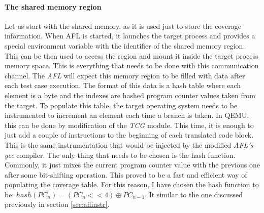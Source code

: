\paragraph{The shared memory region}
Let us start with the shared memory, as it is used just to store the coverage information. When AFL is started, it launches the target process and provides a special environment variable with the identifier of the shared memory region. This can be then used to access the region and mount it inside the target process memory space. This is everything that needs to be done with this communication channel. The \textit{AFL} will expect this memory region to be filled with data after each test case execution. The format of this data is a hash table where each element is a byte and the indexes are hashed program counter values taken from the target. To populate this table, the target operating system needs to be instrumented to increment an element each time a branch is taken. In QEMU, this can be done by modification of the \textit{TCG} module. This time, it is enough to just add a couple of instructions to the beginning of each translated code block. This is the same instrumentation that would be injected by the modified \textit{AFL's gcc} compiler. The only thing that needs to be chosen is the hash function. Commonly, it just mixes the current program counter value with the previous one after some bit-shifting operation. This proved to be a fast and efficient way of populating the coverage table. For this reason, I have chosen the hash function to be: $hash(PC_n) = (PC_n << 4) \oplus PC_{n-1}$. It similar to the one discussed previously in section \ref{sec:aflinstr}.


